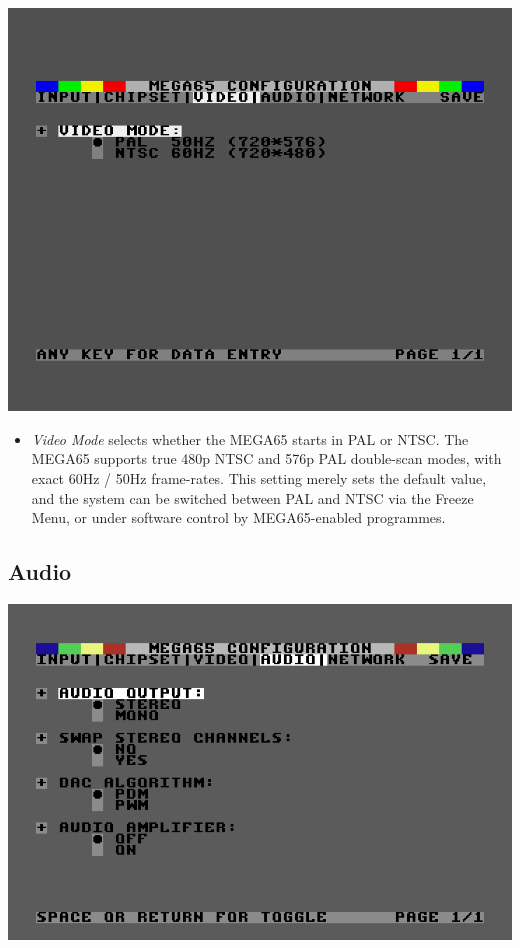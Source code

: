 \includegraphics[width=\linewidth]{images/ss-m65config-3.png}

\begin{itemize}
  \item{\em Video Mode} selects whether the MEGA65 starts in PAL or NTSC.
    The MEGA65 supports true 480p NTSC and 576p PAL double-scan modes,
    with exact 60Hz / 50Hz frame-rates.  This setting merely sets the
    default value, and the system can be switched between PAL and NTSC
    via the Freeze Menu, or under software control by MEGA65-enabled
    programmes.
\end{itemize}

\subsection{Audio}

\includegraphics[width=\linewidth]{images/ss-m65config-4.png}


